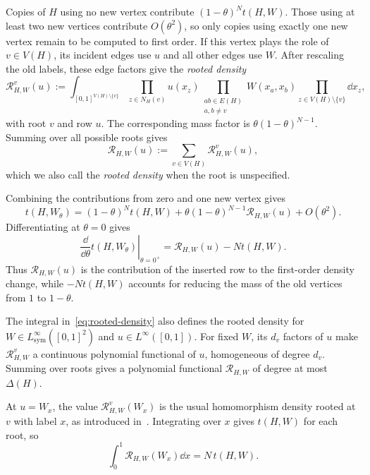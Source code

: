 Copies of $H$ using no new vertex contribute $(1-\theta)^N t(H,W)$.
Those using at least two new vertices contribute $O(\theta^2)$, so
only copies using exactly one new vertex remain to be computed to
first order. If this vertex plays the role of $v\in V(H)$, its incident
edges use $u$ and all other edges use $W$. After rescaling the old
labels, these edge factors give the \emph{rooted density}
\begin{equation}\label{eq:rooted-density}
  \mathcal R_{H,W}^{v}(u):=\int_{[0,1]^{V(H)\setminus\{v\}}}
  \prod_{z\in N_H(v)}u(x_z)
  \prod_{\substack{ab\in E(H)\\ a,b\ne v}}W(x_a,x_b)
  \prod_{z\in V(H)\setminus\{v\}}\dd x_z,
\end{equation}
with root $v$ and row $u$. The corresponding mass factor is
$\theta(1-\theta)^{N-1}$. Summing over all possible roots gives
\begin{equation}\label{eq:total-rooted-density}
  \mathcal R_{H,W}(u):=\sum_{v\in V(H)}\mathcal R_{H,W}^{v}(u),
\end{equation}
which we also call the \emph{rooted density} when the root is unspecified.

Combining the contributions from zero and one new vertex gives
\begin{equation}\label{eq:insertion-density-expansion}
  t(H,W_\theta)=(1-\theta)^N t(H,W)
  +\theta(1-\theta)^{N-1}\mathcal R_{H,W}(u)+O(\theta^2).
\end{equation}
Differentiating at $\theta=0$ gives
\begin{equation}\label{eq:insertion-density-derivative}
  \left.\frac{\dd}{\dd\theta}t(H,W_\theta)\right|_{\theta=0^+}
  =\mathcal R_{H,W}(u)-Nt(H,W).
\end{equation}
Thus $\mathcal R_{H,W}(u)$ is the contribution of the inserted row to the
first-order density change, while $-Nt(H,W)$ accounts for reducing the
mass of the old vertices from $1$ to $1-\theta$.

The integral in~\eqref{eq:rooted-density} also defines the rooted
density for $W\in L^\infty_{\mathrm{sym}}([0,1]^2)$ and
$u\in L^\infty([0,1])$. For fixed $W$, its $d_v$ factors of $u$
make $\mathcal R_{H,W}^{v}$ a continuous polynomial functional of $u$,
homogeneous of degree $d_v$.
Summing over roots gives a polynomial functional
$\mathcal R_{H,W}$ of degree at most $\Delta(H)$.

At $u=W_x$, the value $\mathcal R_{H,W}^{v}(W_x)$ is the usual
homomorphism density rooted at $v$ with label $x$, as introduced
in~\cite{LovaszGraphLimits}.  Integrating over $x$ gives $t(H,W)$
for each root, so
\begin{equation}\label{eq:rooted-average}
  \int_0^1\mathcal R_{H,W}(W_x)\dd x=N\,t(H,W).
\end{equation}

